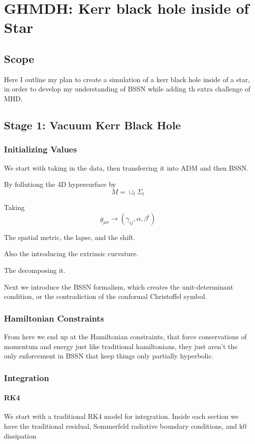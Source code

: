 \chapter{GHMDH: Kerr black hole inside of Star}

\section{Scope}

Here I outline my plan to create a simulation of a kerr black hole inside of a star, in order to develop my understanding of BSSN while adding th extra challenge of MHD.

\section{Stage 1: Vacuum Kerr Black Hole}
\subsection{Initializing Values}
We start with taking in the data, then transferring it into ADM and then BSSN.

By follutiong the 4D hypersurface by
\[
M = \cup_t \Sigma_t
  \]

  Taking
\[
g_{\mu \nu} \to (\gamma_{ij}, \alpha, \beta^i)
  \]

  The spatial metric, the lapse, and the shift.

  Also the introducing the extrinsic curvature.

  The decomposing it.

  Next we introduce the BSSN formalism, which creates the unit-determinant condition, or the contradiction of the conformal Christoffel symbol.

\subsection{Hamiltonian Constraints}
  From here we end up at the Hamiltonian constraints, that force conservations of momentum and energy just like traditional hamiltonians, they just aren't the only enforcement in BSSN that keep things only partially hyperbolic.


\subsection{Integration}
\subsubsection{RK4}
We start with a traditional RK4 model for integration. Inside each section we have the traditional residual, Sommerfeld radiative boundary conditions, and k0 dissipation

